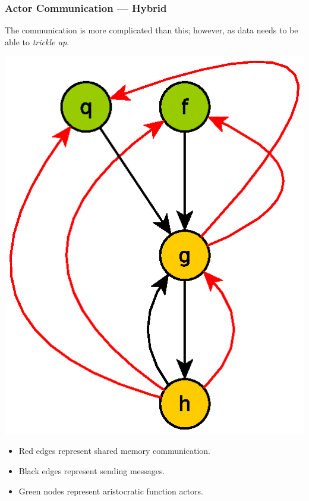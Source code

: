 \documentclass{beamer}
\begin{document}
\begin{frame}[fragile]
  \frametitle{Actor Communication --- Hybrid}

  The communication is more complicated than this; however, as data
  needs to be able to \emph{trickle up}.

  \begin{multicols}{2}
    \begin{center}
      \includegraphics[width=0.7\linewidth]{media/commtypes.eps}
    \end{center}

    \begin{itemize}
      \item {\color{red} Red edges} represent shared memory
        communication.
      \item  Black edges represent sending messages.
      \item {\color{green} Green nodes} represent aristocratic function
      actors.
    \end{itemize}
  \end{multicols}
\end{frame}
\end{document}
